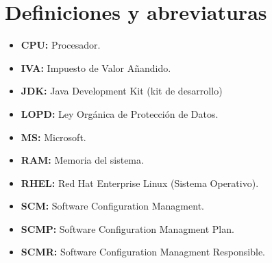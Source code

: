\chapter{Definiciones y abreviaturas}
\begin{itemize}
	\item \textbf{CPU:} Procesador.
	\item \textbf{IVA:} Impuesto de Valor Añandido.
	\item \textbf{JDK:} Java Development Kit (kit de desarrollo)
	\item \textbf{LOPD:} Ley Orgánica de Protección de Datos.
	\item \textbf{MS:} Microsoft.
	\item \textbf{RAM:} Memoria del sistema.
	\item \textbf{RHEL:} Red Hat Enterprise Linux (Sistema Operativo).
	\item \textbf{SCM:} Software Configuration Managment.
	\item \textbf{SCMP:} Software Configuration Managment Plan.
	\item \textbf{SCMR:} Software Configuration Managment Responsible.
\end{itemize}

